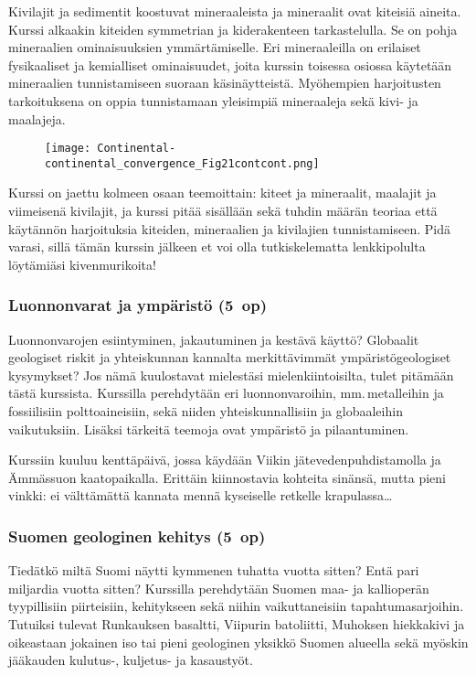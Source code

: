 \documentclass[../ala_hataile.tex]{subfiles}
\begin{document}
Kivilajit ja sedimentit koostuvat mineraaleista ja mineraalit ovat kiteisiä aineita. Kurssi alkaakin kiteiden symmetrian ja kiderakenteen tarkastelulla. Se on pohja mineraalien ominaisuuksien ymmärtämiselle. Eri mineraaleilla on erilaiset fysikaaliset ja kemialliset ominaisuudet, joita kurssin toisessa osiossa käytetään mineraalien tunnistamiseen suoraan käsinäytteistä. Myöhempien harjoitusten tarkoituksena on oppia tunnistamaan yleisimpiä mineraaleja sekä kivi- ja maalajeja. 
\begin{figure}[b!]
	\centering
	\texttt{[image: Continental-continental\_convergence\_Fig21contcont.png]}
\end{figure}

Kurssi on jaettu kolmeen osaan teemoittain: kiteet ja mineraalit, maalajit ja viimeisenä kivilajit, ja kurssi pitää sisällään sekä tuhdin määrän teoriaa että käytännön harjoituksia kiteiden, mineraalien ja kivilajien tunnistamiseen. Pidä varasi, sillä tämän kurssin jälkeen et voi olla tutkiskelematta lenkkipolulta löytämiäsi kivenmurikoita!
\subsubsection*{Luonnonvarat ja ympäristö (5~op)}
Luonnonvarojen esiintyminen, jakautuminen ja kestävä käyttö? Globaalit geologiset riskit ja yhteiskunnan kannalta merkittävimmät ympäristögeologiset kysymykset? Jos nämä kuulostavat mielestäsi mielenkiintoisilta, tulet pitämään tästä kurssista. Kurssilla perehdytään eri luonnonvaroihin, mm.\,metalleihin ja fossiilisiin polttoaineisiin, sekä niiden yhteiskunnallisiin ja globaaleihin vaikutuksiin. Lisäksi tärkeitä teemoja ovat ympäristö ja pilaantuminen. 

Kurssiin kuuluu kenttä\-päivä, jossa käydään Viikin jäte\-veden\-puhdistamolla ja Ämmäs\-suon kaato\-paikalla. Erittäin kiinnostavia kohteita sinänsä, mutta pieni vinkki: ei välttämättä kannata mennä kyseiselle retkelle krapulassa\dots
\subsubsection*{Suomen geologinen kehitys (5~op)}
Tiedätkö miltä Suomi näytti kymmenen tuhatta vuotta sitten? Entä pari miljardia vuotta sitten? Kurssilla perehdytään Suomen maa- ja kallioperän tyypillisiin piirteisiin, kehitykseen sekä niihin vaikuttaneisiin tapahtumasarjoihin. Tutuiksi tulevat Runkauksen basaltti, Viipurin batoliitti, Muhoksen hiekka\-kivi ja oikeastaan jokainen iso tai pieni geologinen yksikkö Suomen alueella sekä myöskin jääkauden kulutus-, kuljetus- ja kasaustyöt. 
\end{document}
